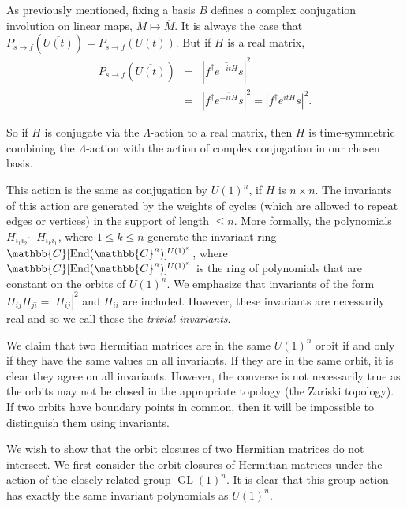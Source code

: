 \documentclass[twocolumn,superscriptaddress]{revtex4-1}
\newcommand{\C}{\mathbb{C}}
\newcommand{\GL}{\operatorname{GL}}
\newcommand{\End}{\textnormal{End}}
\theoremstyle{plain}
\theoremstyle{definition}
\theoremstyle{definition}
\theoremstyle{definition}
\theoremstyle{definition}
\theoremstyle{definition}
\theoremstyle{definition}
\begin{document}
As previously mentioned, fixing a basis $B$ defines a complex conjugation involution on linear maps, $M \mapsto \overline{M}$. 
It is always the case that $P_{s\to f}(\overline{U(t)})=P_{s\to f}(U(t))$. But if $H$ is a real matrix, 
\begin{eqnarray}
P_{s\to f}(\overline{U(t)})&=&|f^\dagger \overline{e^{-itH}} s|^2\\ &=&|f^\dagger e^{\overline{-itH}} s|^2=|f^\dagger e^{itH}s|^2.\nonumber
\end{eqnarray}

So if $H$ is conjugate via the $\Lambda$-action to a real matrix, then $H$ is time-symmetric combining the $\Lambda$-action with the action of %
complex conjugation in our chosen basis. 

 This action is the same as conjugation by $U(1)^n$, if $H$ is $n\times n$. The invariants of this action are generated by the weights of cycles (which are allowed to repeat edges or vertices) in the support of length $\le n$. More formally, the polynomials $H_{i_1i_2}\cdots H_{i_ki_1}$, where $1\le k\le n$ generate the invariant ring $\C[\End(\C^n)]^{U(1)^n}$, where $\C[\End(\C^n)]^{U(1)^n}$ is the ring of polynomials that are constant on the orbits of $U(1)^n$. We emphasize that invariants of the form $H_{ij}H_{ji}=|H_{ij}|^2$ and $H_{ii}$ are included. However, these invariants are necessarily real and so we call these the \emph{trivial invariants}.

We claim that two Hermitian matrices are in the same $U(1)^n$ orbit if and only if they have the same values on all invariants. If they are in the same orbit, it is clear they agree on all invariants. However, the converse is not necessarily true as the orbits may not be closed in the appropriate topology (the Zariski topology). If two orbits have boundary points in common, then it will be impossible to distinguish them using invariants. 

We wish to show that the orbit closures of two Hermitian matrices do not intersect. We first consider the orbit closures of Hermitian matrices under the action of the closely related group $\GL(1)^n$. It is clear that this group action has exactly the same invariant polynomials as $U(1)^n$. 


\end{document}
